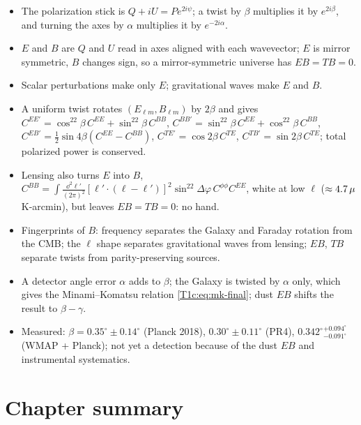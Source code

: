 \begin{recap}
\begin{itemize}[leftmargin=1.2em,itemsep=1pt]
\item The polarization stick is $Q+iU=Pe^{2i\psi}$; a twist by $\beta$ multiplies it by $e^{2i\beta}$, and turning the axes by $\alpha$ multiplies it by $e^{-2i\alpha}$.
\item $E$ and $B$ are $Q$ and $U$ read in axes aligned with each wavevector; $E$ is mirror symmetric, $B$ changes sign, so a mirror-symmetric universe has $EB=TB=0$.
\item Scalar perturbations make only $E$; gravitational waves make $E$ and $B$.
\item A uniform twist rotates $(E_{\ell m},B_{\ell m})$ by $2\beta$ and gives $C^{EE\prime}=\cos^22\beta\,C^{EE}+\sin^22\beta\,C^{BB}$, $C^{BB\prime}=\sin^22\beta\,C^{EE}+\cos^22\beta\,C^{BB}$, $C^{EB\prime}=\frac12\sin4\beta(C^{EE}-C^{BB})$, $C^{TE\prime}=\cos2\beta\,C^{TE}$, $C^{TB\prime}=\sin2\beta\,C^{TE}$; total polarized power is conserved.
\item Lensing also turns $E$ into $B$, $C^{BB}=\int\frac{\dd^2\ell'}{(2\pi)^2}[\bm\ell'\cdot(\bm\ell-\bm\ell')]^2\sin^22\Delta\varphi\,C^{\phi\phi}C^{EE}$, white at low $\ell$ ($\approx4.7\,\mu$K-arcmin), but leaves $EB=TB=0$: no hand.
\item Fingerprints of $B$: frequency separates the Galaxy and Faraday rotation from the CMB; the $\ell$ shape separates gravitational waves from lensing; $EB$, $TB$ separate twists from parity-preserving sources.
\item A detector angle error $\alpha$ adds to $\beta$; the Galaxy is twisted by $\alpha$ only, which gives the Minami--Komatsu relation \eqref{T1c:eq:mk-final}; dust $EB$ shifts the result to $\beta-\gamma$.
\item Measured: $\beta=0.35^\circ\pm0.14^\circ$ (Planck 2018), $0.30^\circ\pm0.11^\circ$ (PR4), $0.342^\circ{}^{+0.094^\circ}_{-0.091^\circ}$ (WMAP + Planck); not yet a detection because of the dust $EB$ and instrumental systematics.
\end{itemize}
\end{recap}
\section*{Chapter summary}
\label{T1a:sec:summary}


